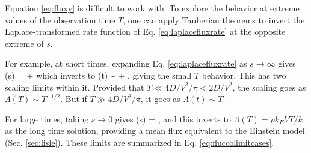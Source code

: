 \label{sec:fluxlimits}
Equation \ref{eq:fluxy} is difficult to work with. To explore the behavior at extreme values of the observation time $T$, one can apply Tauberian theorems \citep{Weiss1994} to invert the Laplace-transformed rate function of Eq. \ref{eq:laplacefluxrate} at the opposite extreme of $s$.
	
For example, at short times, expanding Eq. \ref{eq:laplacefluxrate} as $s\rightarrow \infty$ gives
\be \tilde{\Lambda}(s) =  +  \ee
which inverts to
\be \Lambda(t) \sim {} + ,\ee
giving the small $T$ behavior.
This has two scaling limits within it. Provided that $T \ll 4D/V^2/\pi < 2 D/V^2$, the scaling goes as $\Lambda(T) \sim T^{-1/2}$. But if $T\gg 4D/V^2/\pi$, it goes as $\Lambda(t) \sim T$.

For large times, taking $s\rightarrow 0 $ gives
\be \tilde{\Lambda}(s) = , \ee
and this inverts to $\Lambda(T) = \rho k_E V T/k$ as the long time solution, providing a mean flux equivalent to the Einstein model (Sec. \ref{sec:lisle}).
These limits are summarized in Eq. \ref{eq:fluccolimitcases}.
